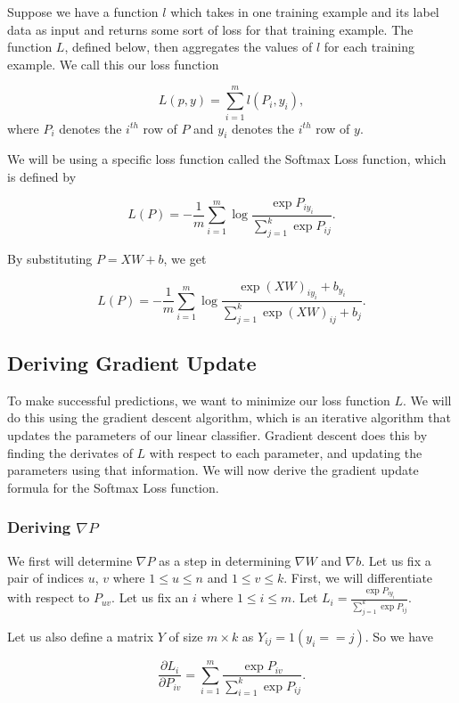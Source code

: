 Suppose we have a function $l$ which takes in one training example and its
label data as input and returns some sort of loss for that training example.
The function $L$, defined below, then aggregates the values of $l$ for each
training example. We call this our loss function

\[
L(p, y) = \sum_{i=1}^m l(P_i, y_i),
\]
where $P_i$ denotes the $i^{th}$ row of $P$ and $y_i$ denotes the $i^{th}$ row
of $y$.

We will be using a specific loss function called the Softmax Loss function,
which is defined by

\[
L(P) = -\frac{1}{m} \sum_{i=1}^m \log \frac{\exp{P_{iy_i}}}
                                           {\sum_{j=1}^k \exp{P_{ij}}}.
\]

By substituting $P = XW + b$, we get

\[
L(P) = -\frac{1}{m} \sum_{i=1}^m \log
        \frac{\exp{\left(XW\right)_{iy_i} + b_{y_i}}}
             {\sum_{j=1}^k \exp{\left(XW\right)_{ij} + b_j}}.
\]

\subsection{Deriving Gradient Update}
To make successful predictions, we want to minimize our loss function $L$. We
will do this using the gradient descent algorithm, which is an iterative
algorithm that updates the parameters of our linear classifier. Gradient
descent does this by finding the derivates of $L$ with respect to each
parameter, and updating the parameters using that information. We will now
derive the gradient update formula for the Softmax Loss function.

\subsubsection{Deriving $\nabla P$}
We first will determine $\nabla P$ as a step in determining $\nabla W$ and
$\nabla b$. Let us fix a pair of indices $u$, $v$ where $1 \leq u \leq n$ and
$1 \leq v \leq k$. First, we will differentiate with respect to $P_{uv}$.
Let us fix an $i$ where $1 \leq i \leq m$.  Let $L_i = \frac{\exp{P_{iy_i}}}
{\sum_{j=1}^k \exp{P_{ij}}}$.


Let us also define a matrix $Y$ of size $m \times k$ as $Y_{ij} = 1(y_i ==
j)$. So we have 

$$\frac{\partial L_i}{\partial P_{iv}} = \sum_{i=1}^m
\frac{\exp{P_{iv}}}{\sum_{i=1}^k \exp{P_{ij}}}.$$

